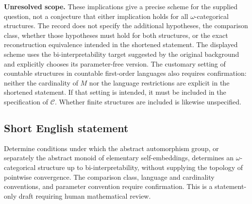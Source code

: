\documentclass[11pt]{article}
\begin{document}
\textbf{Unresolved scope.} These implications give a precise scheme for the supplied question, not a conjecture that either implication holds for all \(\omega\)-categorical structures. The record does not specify the additional hypotheses, the comparison class, whether those hypotheses must hold for both structures, or the exact reconstruction equivalence intended in the shortened statement. The displayed scheme uses the bi-interpretability target suggested by the original background and explicitly chooses its parameter-free version. The customary setting of countable structures in countable first-order languages also requires confirmation: neither the cardinality of \(M\) nor the language restrictions are explicit in the shortened statement. If that setting is intended, it must be included in the specification of \(\mathcal C\). Whether finite structures are included is likewise unspecified.
\subsection{Short English statement}
Determine conditions under which the abstract automorphism group, or separately the abstract monoid of elementary self-embeddings, determines an \(\omega\)-categorical structure up to bi-interpretability, without supplying the topology of pointwise convergence. The comparison class, language and cardinality conventions, and parameter convention require confirmation. This is a statement-only draft requiring human mathematical review.
\end{document}
